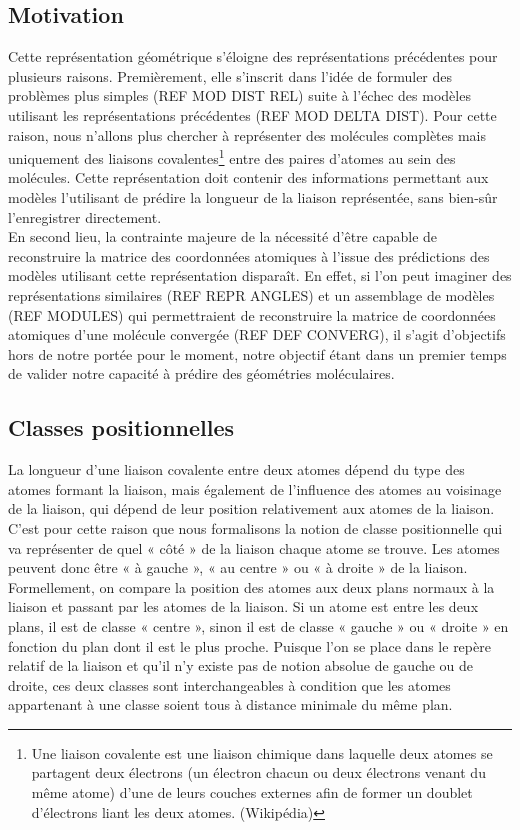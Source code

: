 \subsection{Motivation}

\par Cette représentation géométrique s'éloigne des représentations précédentes pour plusieurs raisons. Premièrement, elle s'inscrit dans l'idée de formuler des problèmes plus simples (REF MOD DIST REL) suite à l'échec des modèles utilisant les représentations précédentes (REF MOD DELTA DIST). Pour cette raison, nous n'allons plus chercher à représenter des molécules complètes mais uniquement des liaisons covalentes\footnote{Une liaison covalente est une liaison chimique dans laquelle deux atomes se partagent deux électrons (un électron chacun ou deux électrons venant du même atome) d'une de leurs couches externes afin de former un doublet d'électrons liant les deux atomes. (Wikipédia)} entre des paires d'atomes au sein des molécules. Cette représentation doit contenir des informations permettant aux modèles l'utilisant de prédire la longueur de la liaison représentée, sans bien-sûr l'enregistrer directement.\\
En second lieu, la contrainte majeure de la nécessité d'être capable de reconstruire la matrice des coordonnées atomiques à l'issue des prédictions des modèles utilisant cette représentation disparaît. En effet, si l'on peut imaginer des représentations similaires (REF REPR ANGLES) et un assemblage de modèles (REF MODULES) qui permettraient de reconstruire la matrice de coordonnées atomiques d'une molécule convergée (REF DEF CONVERG), il s'agit d'objectifs hors de notre portée pour le moment, notre objectif étant dans un premier temps de valider notre capacité à prédire des géométries moléculaires.

\subsection{Classes positionnelles}
\par La longueur d'une liaison covalente entre deux atomes dépend du type des atomes formant la liaison, mais également de l'influence des atomes au voisinage de la liaison, qui dépend de leur position relativement aux atomes de la liaison. C'est pour cette raison que nous formalisons la notion de classe positionnelle qui va représenter de quel « côté » de la liaison chaque atome se trouve. Les atomes peuvent donc être « à gauche », « au centre » ou « à droite » de la liaison.\\
Formellement, on compare la position des atomes aux deux plans normaux à la liaison et passant par les atomes de la liaison. Si un atome est entre les deux plans, il est de classe « centre », sinon il est de classe « gauche » ou « droite » en fonction du plan dont il est le plus proche. Puisque l'on se place dans le repère relatif de la liaison et qu'il n'y existe pas de notion absolue de gauche ou de droite, ces deux classes sont interchangeables à condition que les atomes appartenant à une classe soient tous à distance minimale du même plan.


